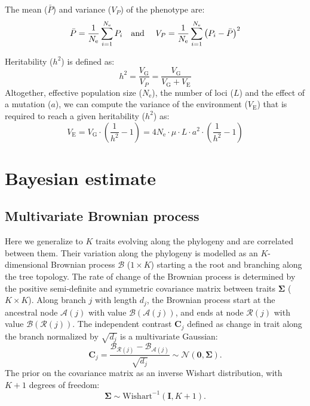 \documentclass{article}
\newcommand{\Multiply}{\cdot}
\newcommand{\UniDimArray}[1]{\bm{#1}}
\newcommand{\BiDimArray}[1]{\bm{#1}}
\newcommand{\Ne}{N_{\text{e}}}
\newcommand{\Trait}{P}
\newcommand{\VecZero}{\UniDimArray{0}}
\newcommand{\MutationRate}{\mu}
\newcommand{\NbrLoci}{L}
\newcommand{\VarPhenotype}{V_{\Trait}}
\newcommand{\VarGenetic}{V_{\mathrm{G}}}
\newcommand{\VarEnv}{V_{\mathrm{E}}}
\newcommand{\Ntrait}{K}
\newcommand{\contrast}{\UniDimArray{C}}
\newcommand{\Covariancematrix}{\Sigma}
\newcommand{\CovarianceMatrix}{\BiDimArray{\Covariancematrix}}
\newcommand{\Identitymatrix}{\BiDimArray{I}}
\newcommand{\brownian}{\mathcal{B}}
\newcommand{\Brownian}{\UniDimArray{\brownian}}
\begin{document}
The mean ($\bar{\Trait}$) and variance ($\VarPhenotype$) of the phenotype are:
\begin{equation}
    \bar{\Trait} = \frac{1}{\Ne}\sum_{i=1}^{\Ne} \Trait_i \text{\quad and \quad} \VarPhenotype = \frac{1}{\Ne}\sum_{i=1}^{\Ne}\left(\Trait_i - \bar{\Trait} \right)^2 \label{eq:simu-between}
\end{equation}

Heritability ($h^2$) is defined as:
\begin{equation}
    h^2 = \frac{\VarGenetic}{\VarPhenotype} = \frac{\VarGenetic}{\VarGenetic + \VarEnv}\label{eq:simu-heritability}
\end{equation}
Altogether, effective population size ($\Ne$), the number of loci ($\NbrLoci$) and the effect of a mutation ($a$), we can compute the variance of the environment ($\VarEnv$) that is required to reach a given heritability ($h^2$) as:
\begin{equation}
    \VarEnv = \VarGenetic \Multiply \left( \frac{1}{h^2} - 1 \right) = 4 \Ne \Multiply \MutationRate \Multiply \NbrLoci \Multiply a^2 \Multiply \left( \frac{1}{h^2} - 1 \right) \label{eq:simu-var-env}
\end{equation}

\newpage
\section{Bayesian estimate}\label{sec:bayesian-estimate}

\subsection{Multivariate Brownian process}\label{subsec:multivariate-brownian-process}
Here we generalize to $\Ntrait$ traits evolving along the phylogeny and are correlated between them.
Their variation along the phylogeny is modelled as an $\Ntrait$-dimensional Brownian process $\Brownian$ ($1 \times \Ntrait$) starting a the root and branching along the tree topology.
The rate of change of the Brownian process is determined by the positive semi-definite and symmetric covariance matrix between traits $\CovarianceMatrix$ ($\Ntrait \times \Ntrait$).
Along branch $j$ with length $d_{j}$, the Brownian process start at the ancestral node $\mathcal{A}(j)$ with value $\Brownian(\mathcal{A}(j))$, and ends at node $\mathcal{R}(j)$  with value $\Brownian(\mathcal{R}(j))$.
The independent contrast $\contrast_{j}$ defined as change in trait along the branch normalized by $\sqrt {d_{j}}$ is a multivariate Gaussian:
\begin{equation}
    \label{eq:DistribBrownian}
    \contrast_{j} = \frac{\Brownian_{\mathcal{R}(j)} - \Brownian_{\mathcal{A}(j)} }{\sqrt {d_{j}}} \sim \mathcal{N}\left(\VecZero, \CovarianceMatrix \right).
\end{equation}
The {prior} on the covariance matrix as an inverse Wishart distribution, with $\Ntrait + 1$ degrees of freedom:
\begin{equation}
    \label{eq:Distribcovariance}
    \CovarianceMatrix \sim \text{Wishart}^{-1} (\Identitymatrix, \Ntrait + 1).
\end{equation}
\end{document}
